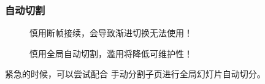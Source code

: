 \begin{shadedsection}
\begin{frame}[fragile]
\begin{columns}[t]
\begin{column}{0.5\textwidth}
    \end{column}
  \end{columns}
\end{frame}

\begin{frame}[fragile]
  \frametitle{自动切割}
  \begin{block}{}
    \begin{description}
      \item[\faExclamationTriangle] 慎用断帧接续，会导致渐进切换无法使用！
      \item[\faExclamationTriangle{} \faExclamationTriangle{}] 慎用全局自动切割，滥用将降低可维护性！
    \end{description}
  \end{block}
  紧急的时候，可以尝试配合  手动分割子页进行全局幻灯片自动切分。
  \begin{columns}
    \begin{column}{0.5\textwidth}
\end{column}
\end{columns}
\end{frame}
\end{shadedsection}
